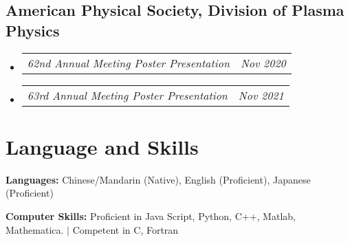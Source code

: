 \documentclass[letterpaper,11pt]{article}
\makeatletter
\newcommand{\resumeItem}[1]{
  \item\small{
    {#1 \vspace{-2pt}}
  }
}
\newcommand{\resumeSubSubheading}[2]{
    \vspace{-8pt}\item
    \begin{tabular*}{0.97\textwidth}{l@{\extracolsep{\fill}}r}
      \textit{\small#1} & \textit{\small #2} \\
    \end{tabular*}\vspace{-10pt}
}
\newcommand{\resumeProjectHeading}[2]{
    \vspace{-2pt}\item
    \begin{tabular*}{0.97\textwidth}{l@{\extracolsep{\fill}}r}
      \small#1 & #2 \\
    \end{tabular*}\vspace{-7pt}
}
\newcommand{\resumeSubHeadingListStart}{\begin{itemize}[leftmargin=0.15in, label={}]}
\newcommand{\resumeSubHeadingListEnd}{\end{itemize}}
\newcommand{\resumeItemListStart}{\begin{itemize}}
\newcommand{\resumeItemListEnd}{\end{itemize}\vspace{-5pt}}
\makeatother
\begin{document}
\subsection*{American Physical Society, Division of Plasma Physics}
\resumeSubHeadingListStart
\resumeSubSubheading{62nd Annual Meeting Poster Presentation}{Nov 2020}
\resumeSubSubheading{63rd Annual Meeting Poster Presentation}{Nov 2021}
\resumeSubHeadingListEnd

\section{Language and Skills}
  \vspace{2pt}
  \resumeSubHeadingListStart
    \small{\item{
        
        \textbf{Languages:}{ Chinese/Mandarin (Native), English (Proficient), Japanese (Proficient)} \\ \vspace{3pt}
        
        \textbf{Computer Skills:}{ Proficient in Java Script, Python, C++, Matlab, Mathematica. $|$ Competent in C, Fortran} \\ \vspace{3pt}
        
        
    }}
  \resumeSubHeadingListEnd



      
      
      
\end{document}
